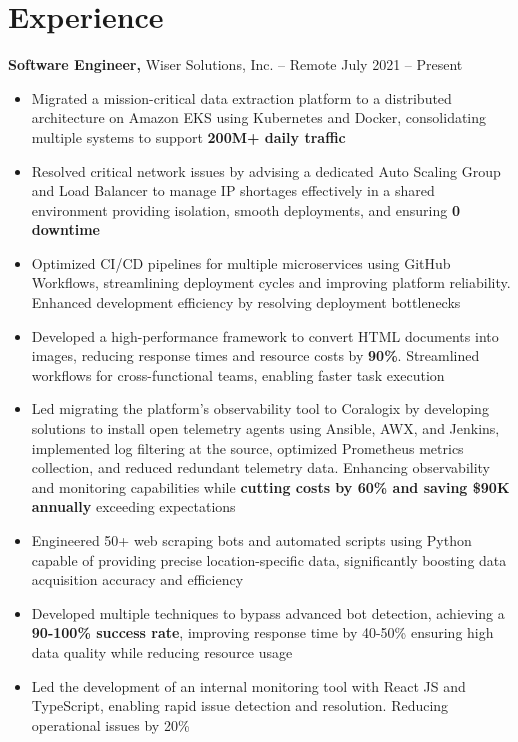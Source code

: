 \documentclass[11pt]{article}       %
\begin{document}
\section*{Experience}
\textbf{Software Engineer,} {Wiser Solutions, Inc.} -- Remote \hfill July 2021 -- Present \\
\vspace{-9pt}
\begin{itemize}
  \item Migrated a mission-critical data extraction platform to a distributed architecture on Amazon EKS using Kubernetes and Docker, consolidating multiple systems to support \textbf{200M+ daily traffic}
  \item Resolved critical network issues by advising a dedicated Auto Scaling Group and Load Balancer to manage IP shortages effectively in a shared environment providing isolation, smooth deployments, and ensuring \textbf{0 downtime}
  \item Optimized CI/CD pipelines for multiple microservices using GitHub Workflows, streamlining deployment cycles and improving platform reliability. Enhanced development efficiency by resolving deployment bottlenecks
  \item Developed a high-performance framework to convert HTML documents into images, reducing response times and resource costs by \textbf{90\%}. Streamlined workflows for cross-functional teams, enabling faster task execution
  \item Led migrating the platform's observability tool to Coralogix by developing solutions to install open telemetry agents using Ansible, AWX, and Jenkins, implemented log filtering at the source, optimized Prometheus metrics collection, and reduced redundant telemetry data. Enhancing observability and monitoring capabilities while \textbf{cutting costs by 60\% and saving \$90K annually} exceeding expectations
  \item Engineered 50+ web scraping bots and automated scripts using Python capable of providing precise location-specific data, significantly boosting data acquisition accuracy and efficiency
  \item Developed multiple techniques to bypass advanced bot detection, achieving a \textbf{90-100\% success rate}, improving response time by 40-50\% ensuring high data quality while reducing resource usage
  \item Led the development of an internal monitoring tool with React JS and TypeScript, enabling rapid issue detection and resolution. Reducing operational issues by 20\%
\end{itemize}
\end{document}
